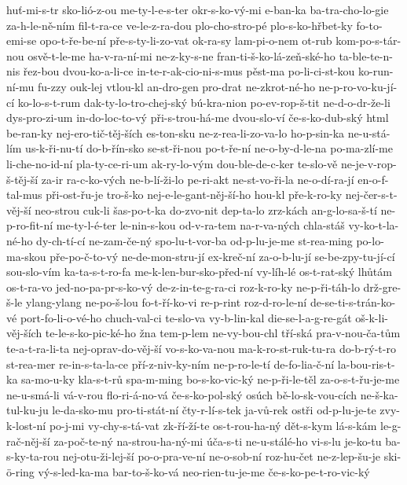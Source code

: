 huť-mi-s-tr
sko-lió-z-ou
me-ty-l-e-s-ter
okr-s-ko-vý-mi
e-ban-ka
ba-tra-cho-lo-gie
za-h-le-ně-ním
fil-t-ra-ce
ve-le-z-ra-dou
plo-cho-stro-pé
plo-s-ko-hřbet-ky
fo-to-emi-se
opo-t-ře-be-ní
pře-s-ty-li-zo-vat
ok-ra-sy
lam-pi-o-nem
ot-rub
kom-po-s-tár-nou
osvě-t-le-me
ha-v-ra-ní-mi
ne-z-ky-s-ne
fran-ti-š-ko-lá-zeň-ské-ho
ta-ble-te-n-nis
řez-bou
dvou-ko-a-li-ce
in-te-r-ak-cio-ni-s-mus
pěst-ma
po-li-ci-st-kou
ko-run-ní-mu
fu-zzy
ouk-lej
vtlou-kl
an-dro-gen
pro-drat
ne-zkrot-né-ho
ne-p-ro-vo-ku-jí-cí
ko-lo-s-t-rum
dak-ty-lo-tro-chej-ský
bú-kra-nion
po-ev-rop-š-tit
ne-d-o-dr-že-li
dys-pro-zi-um
in-do-loc-to-vý
při-s-trou-há-me
dvou-slo-ví
če-s-ko-dub-ský
html
be-ran-ky
nej-ero-tič-těj-ších
es-ton-sku
ne-z-rea-li-zo-va-lo
ho-p-sin-ka
ne-u-stá-lím
us-k-ři-nu-tí
do-b-řín-sko
se-st-ři-nou
po-t-ře-ní
ne-o-by-d-le-na
po-ma-zlí-me
li-che-no-id-ní
pla-ty-ce-ri-um
ak-ry-lo-vým
dou-ble-de-c-ker
te-slo-vě
ne-je-v-rop-š-těj-ší
za-ir
ra-c-ko-vých
ne-b-lí-ži-lo
pe-ri-akt
ne-st-vo-ři-la
ne-o-dí-ra-jí
en-o-f-tal-mus
při-ost-řu-je
tro-š-ko
nej-e-le-gant-něj-ší-ho
hou-kl
pře-k-ro-ky
nej-čer-s-t-věj-ší
neo-strou
cuk-li
šas-po-t-ka
do-zvo-nit
dep-ta-lo
zrz-kách
an-g-lo-sa-š-tí
ne-p-ro-fit-ní
me-ty-l-é-ter
le-nin-s-kou
od-v-ra-tem
na-r-va-ných
chla-stáš
vy-ko-t-la-né-ho
dy-ch-tí-cí
ne-zam-če-ný
spo-lu-t-vor-ba
od-p-lu-je-me
st-rea-ming
po-lo-ma-skou
pře-po-č-to-vý
ne-de-mon-stru-jí
ex-kreč-ní
za-o-b-lu-jí
se-be-zpy-tu-jí-cí
sou-slo-vím
ka-ta-s-t-ro-fa
me-k-len-bur-sko-před-ní
vy-líh-lé
os-t-rat-ský
lhůtám
os-t-ra-vo
jed-no-pa-pr-s-ko-vý
de-z-in-te-g-ra-ci
roz-k-ro-ky
ne-p-ři-táh-lo
drž-gre-š-le
ylang-ylang
ne-po-š-lou
fo-t-ří-ko-vi
re-p-rint
roz-d-ro-le-ní
de-se-ti-s-trán-ko-vé
port-fo-li-o-vé-ho
chuch-val-ci
te-slo-va
vy-b-lin-kal
die-se-l-a-g-re-gát
oš-k-li-věj-ších
te-le-s-ko-pic-ké-ho
žna
tem-p-lem
ne-vy-bou-chl
tří-ská
pra-v-nou-ča-tům
te-a-t-ra-li-ta
nej-oprav-do-věj-ší
vo-s-ko-va-nou
ma-k-ro-st-ruk-tu-ra
do-b-rý-t-ro
st-rea-mer
re-in-s-ta-la-ce
pří-z-niv-ky-ním
ne-p-ro-le-tí
de-fo-lia-č-ní
la-bou-ris-t-ka
sa-mo-u-ky
kla-s-t-rů
spa-m-ming
bo-s-ko-vic-ký
ne-p-ři-le-těl
za-o-s-t-řu-je-me
ne-u-smá-li
vá-v-rou
flo-ri-á-no-vá
če-s-ko-pol-ský
osúch
bě-lo-sk-vou-cích
ne-š-ka-tul-ku-ju
le-da-sko-mu
pro-ti-stát-ní
čty-r-lí-s-tek
ja-vů-rek
ostři
od-p-lu-je-te
zvy-k-lost-ní
po-j-mi
vy-chy-s-tá-vat
zk-ří-ží-te
os-t-rou-ha-ný
dět-s-kym
lá-s-kám
le-g-rač-něj-ší
za-poč-te-ný
na-strou-ha-ný-mi
úča-s-ti
ne-u-stálé-ho
vi-s-lu
je-ko-tu
ba-s-ky-ta-rou
nej-otu-ži-lej-ší
po-o-pra-ve-ní
ne-o-sob-ní
roz-hu-čet
ne-z-lep-šu-je
ski-ö-ring
vý-s-led-ka-ma
bar-to-š-ko-vá
neo-rien-tu-je-me
če-s-ko-pe-t-ro-vic-ký
